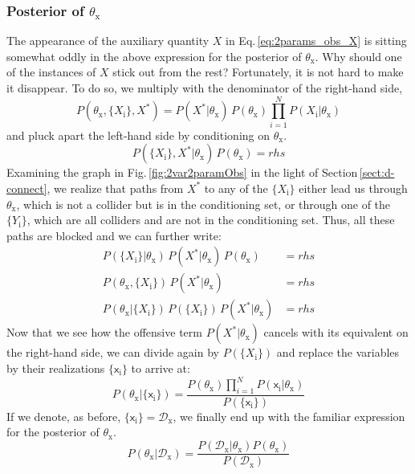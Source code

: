 \documentclass[]{report}
\begin{document}
\subsubsection{Posterior of $\theta_\mathrm{x}$}
The appearance of the auxiliary quantity $X$ in Eq.\,\ref{eq:2params_obs_X} is sitting somewhat oddly in the above expression for the posterior of $\theta_\mathrm{x}$. Why should one of the instances of $X$ stick out from the rest? Fortunately, it is not hard to make it disappear. To do so, we multiply with the denominator of the right-hand side,
\begin{equation}
P( \theta_\mathrm{x}, \{X_\mathrm{i}\}, X^* ) 
=
P( X^* | \theta_\mathrm{x} ) \,
P( \theta_\mathrm{x} )
\prod_{i=1}^{N}
	P (X_\mathrm{i} | \theta_\mathrm{x} )
\end{equation}
and pluck apart the left-hand side by conditioning on $\theta_\mathrm{x}$.
\begin{equation}
P( \{X_\mathrm{i}\}, X^* | \theta_\mathrm{x} ) \,
P( \theta_\mathrm{x} )
= 
rhs
\end{equation}
Examining the graph in Fig.\,\ref{fig:2var2paramObs} in the light of Section\,\ref{sect:d-connect}, we realize that paths from $X^*$ to any of the $ \{ X_\mathrm{i} \} $ either lead us through $\theta_\mathrm{x}$, which is not a collider but is in the conditioning set, or through one of the $\{Y_\mathrm{i}\}$, which are all colliders and are not in the conditioning set. Thus, all these paths are blocked and we can further write:  
\begin{align}
P( \{X_\mathrm{i}\} | \theta_\mathrm{x} ) \,
P( X^* | \theta_\mathrm{x} ) \,
P( \theta_\mathrm{x} )
&=
rhs
\nonumber \\
P( \theta_\mathrm{x}, \{X_\mathrm{i}\} ) \,
P( X^* | \theta_\mathrm{x} )
&= 
rhs
\\
P( \theta_\mathrm{x} | \{X_\mathrm{i}\} ) \,
P( \{X_\mathrm{i}\} ) \,
P( X^* | \theta_\mathrm{x} )
&= 
rhs
\nonumber
\end{align}
Now that we see how the offensive term $P( X^* | \theta_\mathrm{x} ) $ cancels with its equivalent on the right-hand side, we can divide again by $P( \{X_\mathrm{i}\} ) $ and replace the variables by their realizations $ \{ \mathsf{x}_\mathrm{i} \} $ to arrive at:
\begin{equation}
P( \theta_\mathrm{x} | \{ \mathsf{x}_\mathrm{i} \} ) 
=
\frac
	{
		P( \theta_\mathrm{x} )
		\prod_{i=1}^{N}
			P( \mathsf{x}_\mathrm{i} | \theta_\mathrm{x} )
	}
	{
		P( \{ \mathsf{x}_\mathrm{i} \} )
	} 
\end{equation}
If we denote, as before, $ \{ \mathsf{x}_\mathrm{i} \} = \mathcal{D}_\mathrm{x}$, we finally end up with the familiar expression for the posterior of $\theta_\mathrm{x}$.
\begin{equation}
P( \theta_\mathrm{x} | \mathcal{D}_\mathrm{x} ) 
= 
\frac
	{
		P( \mathcal{D}_\mathrm{x} | \theta_\mathrm{x} )
		P( \theta_\mathrm{x} )
	}
	{
		P( \mathcal{D}_\mathrm{x} )
	} 
\end{equation}
\end{document}
